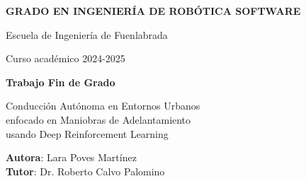 \thispagestyle{empty}
\vspace{2cm}

\begin{figure}[htb]
  \centerline{}
\end{figure}

\begin{center}
  {\Large {\bf GRADO EN INGENIERÍA DE ROBÓTICA SOFTWARE}}
  \vspace{5mm}
 
  {\large {Escuela de Ingeniería de Fuenlabrada}}
  \vspace{5mm}

  {\large {Curso académico 2024-2025}}

  \vspace{1cm}

  {\large {\bf Trabajo Fin de Grado}}

  \vspace{2cm}

  {\Large {Conducción Autónoma en Entornos Urbanos \\
 enfocado en Maniobras de Adelantamiento \\
 usando Deep Reinforcement Learning \\[1cm] }}

  \vspace{5cm}
  {\bf Autora}: Lara Poves Martínez \\
  {\bf Tutor}: Dr. Roberto Calvo Palomino 

\end{center}

\clearpage
\thispagestyle{empty}
